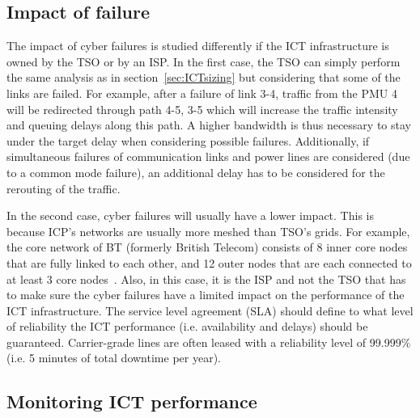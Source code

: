 
\subsection{Impact of failure}
\label{sec:ICTfailure}

The impact of cyber failures is studied differently if the ICT infrastructure is owned by the TSO or by an ISP. In the first case, the TSO can simply perform the same analysis as in section~\ref{sec:ICTsizing} but considering that some of the links are failed. For example, after a failure of link 3-4, traffic from the PMU 4 will be redirected through path 4-5, 3-5 which will increase the traffic intensity and queuing delays along this path. A higher bandwidth is thus necessary to stay under the target delay when considering possible failures. Additionally, if simultaneous failures of communication links and power lines are considered (due to a common mode failure), an additional delay has to be considered for the rerouting of the traffic.

In the second case, cyber failures will usually have a lower impact. This is because ICP's networks are usually more meshed than TSO's grids. For example, the core network of BT (formerly British Telecom) consists of 8 inner core nodes that are fully linked to each other, and 12 outer nodes that are each connected to at least 3 core nodes~\cite{BTnetwork}. Also, in this case, it is the ISP and not the TSO that has to make sure the cyber failures have a limited impact on the performance of the ICT infrastructure. The service level agreement (SLA) should define to what level of reliability the ICT performance (i.e. availability and delays) should be guaranteed. Carrier-grade lines are often leased with a reliability level of 99.999\% (i.e. 5 minutes of total downtime per year).

\subsection{Monitoring ICT performance}
\label{sec:ICTmonitoring}

